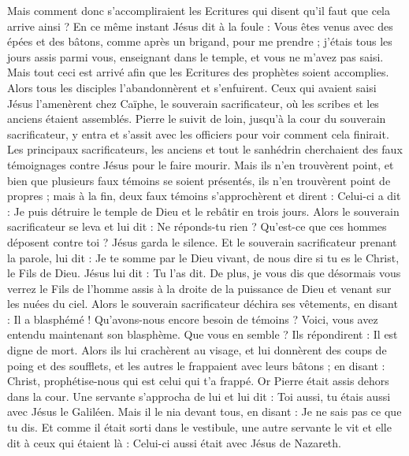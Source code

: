 \begin{multicols}{2}
Mais comment donc s'accompliraient les Ecritures qui disent qu'il faut que cela arrive ainsi ?
En ce même instant Jésus dit à la foule : Vous êtes venus avec des épées et des bâtons, comme après un brigand, pour me prendre ; j'étais tous les jours assis parmi vous, enseignant dans le temple, et vous ne m'avez pas saisi.
Mais tout ceci est arrivé afin que les Ecritures des prophètes soient accomplies. Alors tous les disciples l'abandonnèrent et s'enfuirent.
Ceux qui avaient saisi Jésus l'amenèrent chez Caïphe, le souverain sacrificateur, où les scribes et les anciens étaient assemblés.
Pierre le suivit de loin, jusqu'à la cour du souverain sacrificateur, y entra et s'assit avec les officiers pour voir comment cela finirait.
Les principaux sacrificateurs, les anciens et tout le sanhédrin cherchaient des faux témoignages contre Jésus pour le faire mourir.
Mais ils n'en trouvèrent point, et bien que plusieurs faux témoins se soient présentés, ils n'en trouvèrent point de propres ; mais à la fin, deux faux témoins s'approchèrent
et dirent : Celui-ci a dit : Je puis détruire le temple de Dieu et le rebâtir en trois jours.
Alors le souverain sacrificateur se leva et lui dit : Ne réponds-tu rien ? Qu'est-ce que ces hommes déposent contre toi ?
Jésus garda le silence. Et le souverain sacrificateur prenant la parole, lui dit : Je te somme par le Dieu vivant, de nous dire si tu es le Christ, le Fils de Dieu.
Jésus lui dit : Tu l'as dit. De plus, je vous dis que désormais vous verrez le Fils de l'homme assis à la droite de la puissance de Dieu et venant sur les nuées du ciel.
Alors le souverain sacrificateur déchira ses vêtements, en disant : Il a blasphémé ! Qu'avons-nous encore besoin de témoins ? Voici, vous avez entendu maintenant son blasphème. Que vous en semble ?
Ils répondirent : Il est digne de mort.
Alors ils lui crachèrent au visage, et lui donnèrent des coups de poing et des soufflets, et les autres le frappaient avec leurs bâtons ;
en disant : Christ, prophétise-nous qui est celui qui t'a frappé.
Or Pierre était assis dehors dans la cour. Une servante s'approcha de lui et lui dit : Toi aussi, tu étais aussi avec Jésus le Galiléen.
Mais il le nia devant tous, en disant : Je ne sais pas ce que tu dis.
Et comme il était sorti dans le vestibule, une autre servante le vit et elle dit à ceux qui étaient là : Celui-ci aussi était avec Jésus de Nazareth.

\end{multicols}
